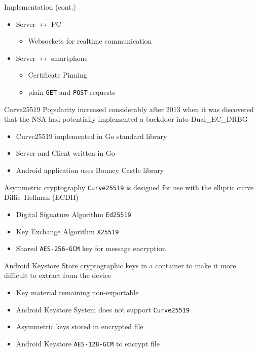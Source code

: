 \documentclass[aspectratio=169]{beamer}
\newcommand{\cipher}[1]{\texttt{#1}}
\begin{document}
  \begin{frame}{Implementation (cont.)}
    \begin{itemize}
      \item Server $\leftrightarrow$ PC
      \begin{itemize}
        \item Websockets for realtime communication
      \end{itemize}
      \item Server $\leftrightarrow$ smartphone
      \begin{itemize}
        \item Certificate Pinning
        \item plain \texttt{GET} and \texttt{POST} requests
      \end{itemize}
    \end{itemize}
  \end{frame}

  \begin{frame}{Curve25519}
    Popularity increased considerably after 2013 when it was discovered that the NSA had potentially implemented a backdoor into Dual\_EC\_DRBG
    \begin{itemize}
      \item Curve25519 implemented in Go standard library
      \item Server and Client written in Go
      \item Android application uses Bouncy Castle library
    \end{itemize}
  \end{frame}

  \begin{frame}{Asymmetric cryptography}
    \cipher{Curve25519} is designed for use with the elliptic curve Diffie–Hellman (ECDH)
    \begin{itemize}
      \item Digital Signature Algorithm \cipher{Ed25519}
      \item Key Exchange Algorithm \cipher{X25519}
      \item Shared \cipher{AES-256-GCM} key for message encryption
    \end{itemize}
  \end{frame}

  \begin{frame}{Android Keystore}
    Store cryptographic keys in a container to make it more difficult to extract from the device
    \begin{itemize}
      \item Key material remaining non-exportable
      \item Android Keystore System does not support \cipher{Curve25519}
      \item Asymmetric keys stored in encrypted file
      \item Android Keystore \cipher{AES-128-GCM} to encrypt file
    \end{itemize}
  \end{frame}
\end{document}
